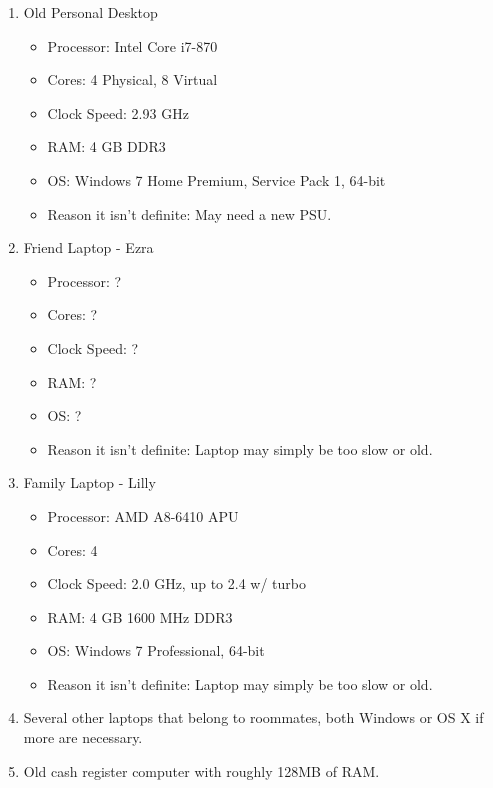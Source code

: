 \documentclass[11pt]{article}
\begin{document}
\begin{enumerate}
\item{Old Personal Desktop
	\begin{itemize}
	\item{Processor: Intel Core i7-870}
	\item{Cores: 4 Physical, 8 Virtual}
	\item{Clock Speed: 2.93 GHz}
	\item{RAM: 4 GB DDR3}
	\item{OS: Windows 7 Home Premium, Service Pack 1, 64-bit}
	\item{Reason it isn't definite: May need a new PSU.}
	\end{itemize}
	}
\item{Friend Laptop - Ezra
	\begin{itemize}
	\item{Processor: ?}
	\item{Cores: ?}
	\item{Clock Speed: ?}
	\item{RAM: ?}
	\item{OS: ?}
	\item{Reason it isn't definite: Laptop may simply be too slow or old.}
	\end{itemize}
	}
\item{Family Laptop - Lilly
	\begin{itemize}
	\item{Processor: AMD A8-6410 APU}
	\item{Cores: 4}
	\item{Clock Speed: 2.0 GHz, up to 2.4 w/ turbo}
	\item{RAM: 4 GB 1600 MHz DDR3}
	\item{OS: Windows 7 Professional, 64-bit}
	\item{Reason it isn't definite: Laptop may simply be too slow or old.}
	\end{itemize}
	}
\item{Several other laptops that belong to roommates, both Windows or OS X if more are necessary.}
\item{Old cash register computer with roughly 128MB of RAM.}
\end{enumerate}
\end{document}
